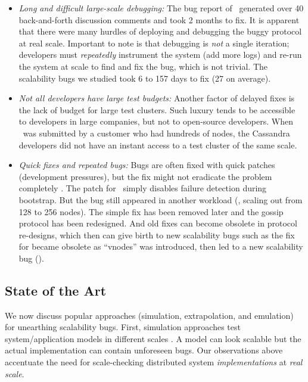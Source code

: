 \begin{itemize}
% 
\item {\em Long and difficult large-scale debugging:}
%
The bug report of \caone\ generated over 40 back-and-forth discussion
comments and took 2 months to fix.  It is apparent \cite{CA-One} that
there were many hurdles of deploying and debugging the buggy protocol at
real scale.  Important to note is that debugging is {\em not} a single
iteration; developers must {\em repeatedly} instrument the system (add
more logs) and re-run the system at scale to find and fix the bug, which
is not trivial.  The scalability bugs we studied took 6 to 157 days to
fix (27 on average).

\item {\em Not all developers have large test budgets:}
%
Another factor of delayed fixes is the lack of budget for large
test clusters.  Such luxury tends to be accessible to developers
in large companies, but not to
open-source developers.  When
\caone\ was submitted by a customer who had hundreds of nodes, the
Cassandra developers did not have an instant access to a test cluster of
the same scale.

\item {\em Quick fixes and repeated bugs:} Bugs are often fixed with quick
patches (development pressures), but the fix might not eradicate the problem
completely \cite{Yin+11-FixesBecomeBugs}.
%
The patch for \caone\ simply disables failure detection during bootstrap. But
the bug still appeared in another workload (\eg, scaling out from 128 to 256
nodes).
%
The simple fix has been removed later and the gossip protocol has been
redesigned.
%
And old fixes can become obsolete in protocol re-designs, which then can give
birth to new scalability bugs such as the fix for  became obsolete as
``vnodes'' was introduced, then led to a new scalability bug ().

\end{itemize}

\subsection{State of the Art}

We now discuss popular approaches (simulation, extrapolation, and emulation) for
unearthing scalability bugs.
First, simulation approaches test system/application models in different scales
\cite{Calotoiu+13-ApmScaleBug, Laguna+15-DebugAtScale}. A model can look
scalable but the actual implementation can contain unforeseen bugs. Our
observations above accentuate the need for scale-checking distributed system
{\em implementations} at {\em real scale}.


